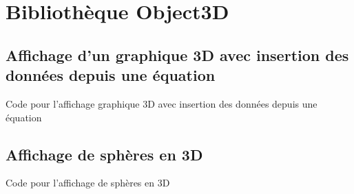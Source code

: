 \chapter{Bibliothèque Object3D}

\section{Affichage d'un graphique 3D avec insertion des données depuis une équation}

\begin{Latex}{Code pour l'affichage graphique 3D avec insertion des données depuis une équation}
\end{Latex}

\section{Affichage de sphères en 3D}


\begin{Latex}{Code pour l'affichage de sphères en 3D}
\end{Latex}
